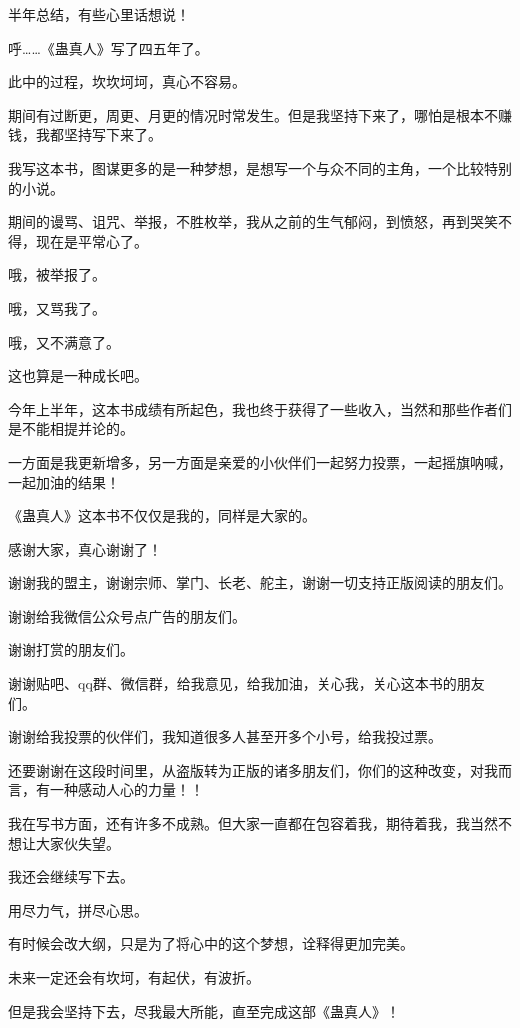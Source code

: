 \begin{this_body} \par
半年总结，有些心里话想说！

呼……《蛊真人》写了四五年了。

此中的过程，坎坎坷坷，真心不容易。

期间有过断更，周更、月更的情况时常发生。但是我坚持下来了，哪怕是根本不赚钱，我都坚持写下来了。

我写这本书，图谋更多的是一种梦想，是想写一个与众不同的主角，一个比较特别的小说。

期间的谩骂、诅咒、举报，不胜枚举，我从之前的生气郁闷，到愤怒，再到哭笑不得，现在是平常心了。

哦，被举报了。

哦，又骂我了。

哦，又不满意了。

这也算是一种成长吧。

今年上半年，这本书成绩有所起色，我也终于获得了一些收入，当然和那些作者们是不能相提并论的。

一方面是我更新增多，另一方面是亲爱的小伙伴们一起努力投票，一起摇旗呐喊，一起加油的结果！

《蛊真人》这本书不仅仅是我的，同样是大家的。

感谢大家，真心谢谢了！

谢谢我的盟主，谢谢宗师、掌门、长老、舵主，谢谢一切支持正版阅读的朋友们。

谢谢给我微信公众号点广告的朋友们。

谢谢打赏的朋友们。

谢谢贴吧、qq群、微信群，给我意见，给我加油，关心我，关心这本书的朋友们。

谢谢给我投票的伙伴们，我知道很多人甚至开多个小号，给我投过票。

还要谢谢在这段时间里，从盗版转为正版的诸多朋友们，你们的这种改变，对我而言，有一种感动人心的力量！！

我在写书方面，还有许多不成熟。但大家一直都在包容着我，期待着我，我当然不想让大家伙失望。

我还会继续写下去。

用尽力气，拼尽心思。

有时候会改大纲，只是为了将心中的这个梦想，诠释得更加完美。

未来一定还会有坎坷，有起伏，有波折。

但是我会坚持下去，尽我最大所能，直至完成这部《蛊真人》！


\end{this_body}
